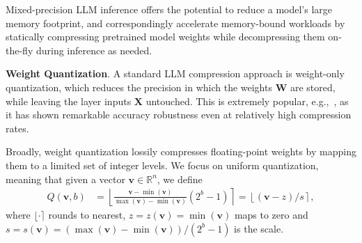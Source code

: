 \documentclass{article}
\theoremstyle{plain}
\theoremstyle{definition}
\theoremstyle{remark}
\newcommand{\htor}[1]{\textcolor{green}{[htor: #1]}}
\newcommand{\myvec}[1]{\pmb{#1}}
\newcommand{\zeros}{z}
\newcommand{\scale}{s}
\newcommand{\bits}{b}
\renewcommand{\paragraph}[1]{\vspace{0.1em}\noindent\textbf{#1}}
\begin{document}
Mixed-precision LLM inference offers the potential to reduce a model's large memory footprint, and correspondingly accelerate memory-bound workloads by statically compressing pretrained model weights while decompressing them on-the-fly during inference as needed.



\paragraph{Weight Quantization}. 
A standard LLM compression approach is weight-only quantization, which reduces the precision in which the weights $\boldsymbol{W}$ are stored, while leaving the layer inputs $\boldsymbol{X}$ untouched. 
This is extremely popular, e.g.,~\cite{frantar2022gptq, lin2023awq, dettmers2022case, dettmers2022llm, dettmers2023spqr},
 as it has shown remarkable accuracy robustness even at relatively high compression rates.

Broadly, weight quantization lossily compresses floating-point weights by mapping them to a limited set of integer levels. We focus on uniform quantization, meaning that given a vector $\myvec{v} \in \mathbb{R}^n$, we define 
\begin{align}
\label{eq:quantization}
Q \left( \myvec{v}, b \right)
&= \left\lfloor \frac{\myvec{v} - \min\left(\myvec{v}\right)}{\max\left(\myvec{v}\right) - \min\left(\myvec{v}\right)} \left( 2^\bits - 1 \right) \right\rceil \nonumber = \left\lfloor \left( \myvec{v} - \zeros \right) / \scale \right\rceil,
\end{align}
where $\lfloor \cdot \rceil$ rounds to nearest, $\zeros = \zeros \left(\myvec{v}\right) = \min\left(\myvec{v}\right)$ maps to zero and $\scale = \scale\left(\myvec{v}\right)
= \left( \max\left(\myvec{v}\right) - \min\left(\myvec{v}\right) \right) / \left( 2^\bits -1 \right)$ is the scale. 
\end{document}
